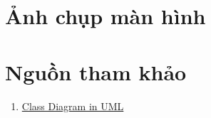 \documentclass[a4paper,12pt]{report}
\begin{document}
\pagebreak
\section{Ảnh chụp màn hình}

\pagebreak
\section{Nguồn tham khảo}
\begin{enumerate}
  \item \href{https://www.youtube.com/watch?v=oBykLn64AUc}{Class Diagram in UML}
\end{enumerate}
\end{document}
